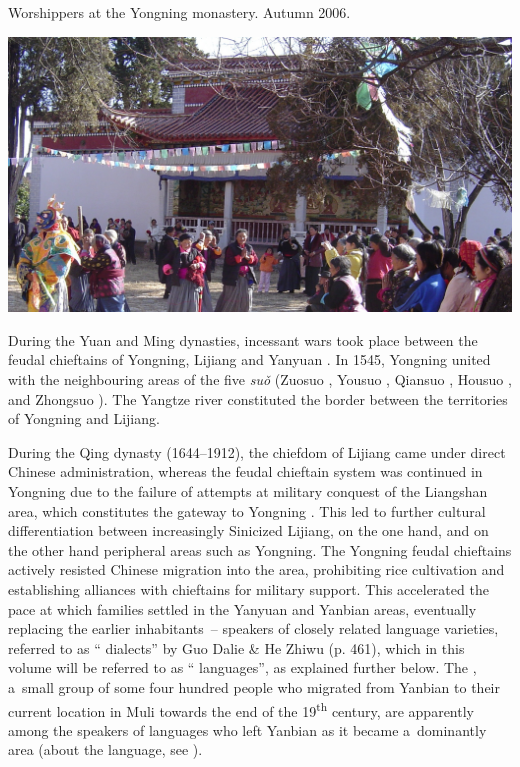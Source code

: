 \begin{photofigure}[t]
	\caption{Worshippers at the Yongning monastery. Autumn 2006.}
	\includegraphics[width=\textwidth]{figures/worshippers.jpg}
\end{photofigure}

During the Yuan and Ming dynasties, incessant wars took place between the feudal chieftains of Yongning,
Lijiang and 
Yanyuan \citep[430--431]{guoetal1994}. In 1545, Yongning
united with the neighbouring areas of the five \textit{suǒ}  
(Zuosuo , Yousuo , 
Qiansuo , Housuo , and 
Zhongsuo ). The Yangtze river constituted
the border between the territories of Yongning and Lijiang.

During the Qing dynasty (1644--1912), the  chiefdom of Lijiang came under direct Chinese administration, whereas the
feudal chieftain system was continued in Yongning due to the failure of attempts at military conquest of
the 
Liangshan   area, which constitutes the gateway to Yongning \citep[460]{guoetal1994}. This led to
further cultural differentiation between increasingly Sinicized Lijiang, on the one hand, and on the other hand peripheral areas such as Yongning. The Yongning feudal chieftains actively
resisted Chinese migration into the area, prohibiting rice cultivation and establishing alliances with  chieftains for military support. This accelerated the pace at which  families settled in the Yanyuan and
Yanbian areas, eventually replacing the earlier inhabitants~-- speakers of closely related language
varieties, referred to as “ dialects” by Guo Dalie \& He Zhiwu (p. 461), which in this volume will be referred to as “ languages”, as explained further
below. The , a~small group of some four hundred people who migrated from Yanbian to their
current location in Muli towards the end of the 19\textsuperscript{th} century, are apparently among the speakers of  languages who left Yanbian as
it became a~dominantly  area (about the  language, see \citealt{huang2009}).

